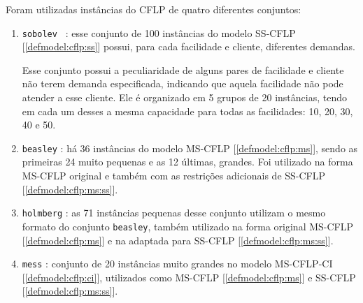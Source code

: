 \documentclass[]{article}
\newcommand{ \instance }[1]{\texttt{#1}}
\newif\ifartigo
\begin{document}
		Foram utilizadas instâncias do CFLP de quatro diferentes conjuntos:
		\begin{enumerate}
			\item \instance{sobolev	} \cite{sobolev}: 	
				esse conjunto de 100 instâncias do modelo SS-CFLP [\ref{defmodel:cflp:ss}] possui, para cada facilidade e cliente, diferentes demandas. 
				\ifartigo
					Foi utilizado somente com fonte única, apresentado na tabela \ref{cflp:tab:1} como \instance{sobolev	.ss}.
				\fi	
				Esse conjunto possui a peculiaridade de alguns pares de facilidade e cliente não terem demanda especificada, indicando que aquela facilidade não pode atender a esse cliente.
				Ele é organizado em 5 grupos de 20 instâncias, tendo em cada um desses a mesma capacidade para todas as facilidades: 10, 20, 30, 40 e 50.
				
			\item \instance{beasley} \cite{beasley}:
				há 36 instâncias do modelo MS-CFLP [\ref{defmodel:cflp:ms}], sendo as primeiras 24 muito pequenas e as 12 últimas, grandes.
				Foi utilizado na forma MS-CFLP original e também com as restrições adicionais de SS-CFLP [\ref{defmodel:cflp:ms:ss}].
				\ifartigo
					Nas tabelas \ref{cflp:tab:1}, \ref{cflp:tab:4} e \ref{cflp:tab:6} é apresentado esse conjunto em partes: 
					\instance{beasley.small.ms} e \instance{beasley.small.ss} referem-se às 24 instâncias menores, com múltiplas fontes (MS) e fonte única (SS);  
					\instance{beasley.large.ms} e \instance{beasley.large.ss} são as 12 grandes, MS e SS.
				\fi	
				
			\item \instance{holmberg} \cite{holmberg}:				
				as 71 instâncias pequenas desse conjunto utilizam o mesmo formato do conjunto \instance{beasley}, também utilizado na forma original MS-CFLP [\ref{defmodel:cflp:ms}] e na adaptada para SS-CFLP [\ref{defmodel:cflp:ms:ss}].
				\ifartigo
					Estão apresentadas nas tabelas \ref{cflp:tab:1} e \ref{cflp:tab:6} como \instance{holmberg.ms} e \instance{holmberg.ss} para as soluções MS e SS.
				\fi	
				
			\item \instance{mess} \cite{mess}:	
				conjunto de 20 instâncias muito grandes no modelo MS-CFLP-CI [\ref{defmodel:cflp:ci}], utilizados como MS-CFLP [\ref{defmodel:cflp:ms}] e SS-CFLP [\ref{defmodel:cflp:ms:ss}].
				\ifartigo
					Chamado de \instance{mess.ms} e \instance{mess.ss} nas tabelas \ref{cflp:tab:5} e \ref{cflp:tab:0}
				\fi	
		\end{enumerate} 
	
\end{document}
